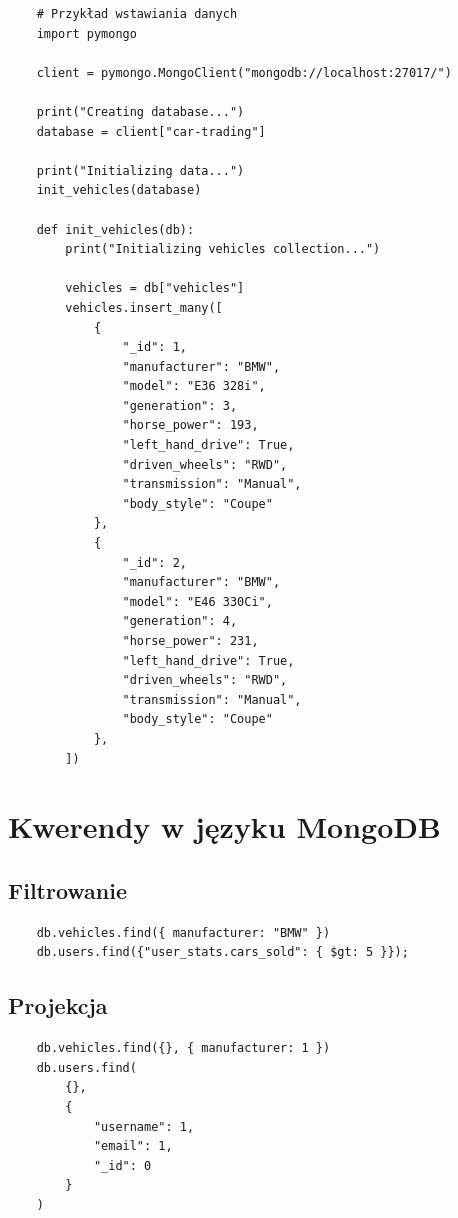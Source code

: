 \documentclass[a4paper,11pt]{article}
\begin{document}
\begin{verbatim}
    # Przykład wstawiania danych
    import pymongo

    client = pymongo.MongoClient("mongodb://localhost:27017/")

    print("Creating database...")
    database = client["car-trading"]

    print("Initializing data...")
    init_vehicles(database)

    def init_vehicles(db):
        print("Initializing vehicles collection...")

        vehicles = db["vehicles"]
        vehicles.insert_many([
            {
                "_id": 1,
                "manufacturer": "BMW",
                "model": "E36 328i",
                "generation": 3,
                "horse_power": 193,
                "left_hand_drive": True,
                "driven_wheels": "RWD",
                "transmission": "Manual",
                "body_style": "Coupe"
            },
            {
                "_id": 2,
                "manufacturer": "BMW",
                "model": "E46 330Ci",
                "generation": 4,
                "horse_power": 231,
                "left_hand_drive": True,
                "driven_wheels": "RWD",
                "transmission": "Manual",
                "body_style": "Coupe"
            },
        ])
\end{verbatim}

\section*{Kwerendy w języku MongoDB}

\subsection*{Filtrowanie}
\begin{verbatim}
    db.vehicles.find({ manufacturer: "BMW" })
    db.users.find({"user_stats.cars_sold": { $gt: 5 }});
\end{verbatim}

\subsection*{Projekcja}
\begin{verbatim}
    db.vehicles.find({}, { manufacturer: 1 })
    db.users.find(
        {}, 
        { 
            "username": 1, 
            "email": 1, 
            "_id": 0 
        }
    )
\end{verbatim}
\end{document}
